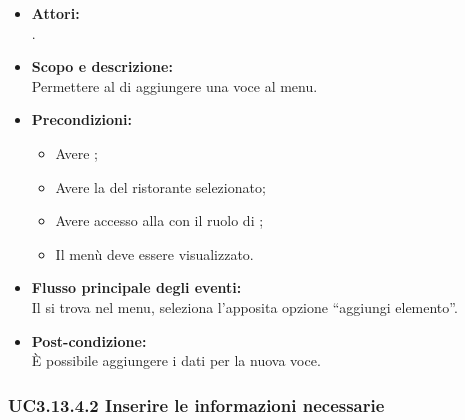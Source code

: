 \begin{itemize}
	\item \textbf{Attori:}
	\\.
	\item \textbf{Scopo e descrizione:} 
	\\Permettere al  di aggiungere una voce al menu.
	\item \textbf{Precondizioni:}
	\begin{itemize}
		\item Avere ;
		\item Avere la  del ristorante selezionato;
		\item Avere accesso alla  con il ruolo di ;
		\item Il menù deve essere visualizzato.
	\end{itemize}
	\item \textbf{Flusso principale degli eventi:}
	\\Il {} si trova nel menu, seleziona l'apposita opzione “aggiungi elemento”.
	\item \textbf{Post-condizione:}
	\\È possibile aggiungere i dati per la nuova voce.
\end{itemize}

\subsubsection{UC3.13.4.2 Inserire le informazioni necessarie} \label{UC3.13.4.2}

